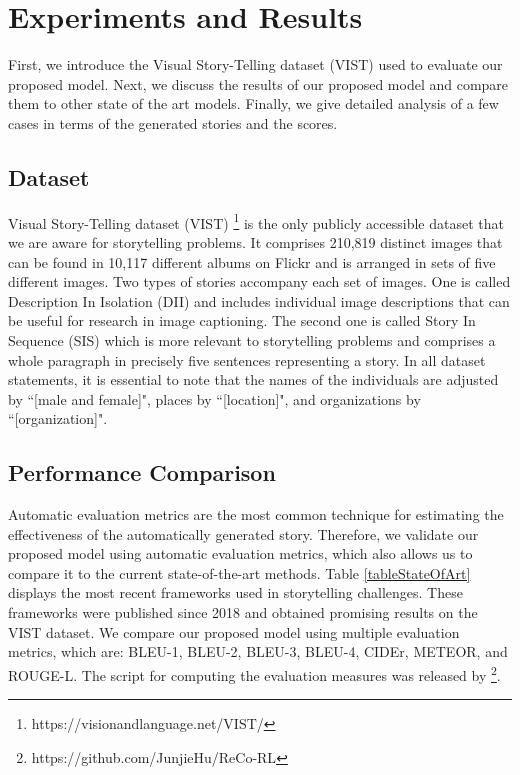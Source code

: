 \documentclass[runningheads]{llncs}
\begin{document}
\section{Experiments and Results}
First, we introduce the Visual Story-Telling dataset (VIST) used to evaluate our proposed model. Next, we discuss the results of our proposed model and compare them to other state of the art models. Finally, we give detailed analysis of a few cases in terms of the generated stories and the scores.

\subsection{Dataset} \label{datadet}
Visual Story-Telling dataset (VIST) \cite{huang2016visual}\footnote{https://visionandlanguage.net/VIST/} is the only publicly accessible dataset that we are aware for storytelling problems. It comprises 210,819 distinct images that can be found in 10,117 different albums on Flickr and is arranged in sets of five different images. Two types of stories accompany each set of images. One is called Description In Isolation (DII) and includes individual image descriptions that can be useful for research in image captioning. The second one is called Story In Sequence (SIS) which is more relevant to storytelling problems and comprises a whole paragraph in precisely five sentences representing a story. In all dataset statements, it is essential to note that the names of the individuals are adjusted by ``[male and female]", places by ``[location]", and organizations by ``[organization]".

\subsection{Performance Comparison}
Automatic evaluation metrics are the most common technique for estimating the effectiveness of the automatically generated story. Therefore, we validate our proposed model using automatic evaluation metrics, which also allows us to compare it to the current state-of-the-art methods. Table \ref{tableStateOfArt} displays the most recent frameworks used in storytelling challenges. These frameworks were published since 2018 and obtained promising results on the VIST dataset. We compare our proposed model using multiple evaluation metrics, which are: BLEU-1, BLEU-2, BLEU-3, BLEU-4, CIDEr, METEOR, and ROUGE-L. The script for computing the evaluation measures was released by \cite{hu2020makes}\footnote{https://github.com/JunjieHu/ReCo-RL}.
\end{document}
